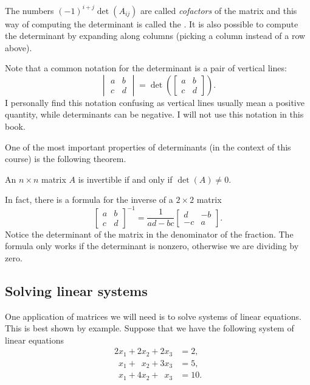 \documentclass[12pt]{book}
\begin{document}
The numbers ${(-1)}^{i+j}\det(A_{ij})$ are called
\emph{cofactors}
of the matrix and
this way of computing the determinant is called the
\emph{}.  It is also possible to compute the
determinant by expanding
along columns (picking a column instead of a row above).

Note that a common notation for the determinant is a pair of vertical
lines:
\begin{equation*}
\begin{vmatrix}
a & b \\
c & d
\end{vmatrix}
=
\det \left(
\begin{bmatrix}
a & b \\
c & d
\end{bmatrix}
\right) .
\end{equation*}
I personally find this notation confusing as vertical lines usually
mean a positive quantity, while determinants can be negative.  I will not
use this notation in this book.

\medskip

One of the most important properties of determinants (in the context of
this course)
is the following theorem.

\begin{theorem}
An $n \times n$ matrix $A$ is invertible if and only if $\det (A) \not= 0$.
\end{theorem}

In fact, there is a formula for the inverse of a $2 \times 2$ matrix
\begin{equation*}
\begin{bmatrix}
a & b \\
c & d
\end{bmatrix}^{-1}
=
\frac{1}{ad-bc}
\begin{bmatrix}
d & -b \\
-c & a
\end{bmatrix} .
\end{equation*}
Notice the determinant of the matrix in the denominator of the fraction.
The formula only works if the determinant is nonzero, otherwise we are
dividing by zero.

\subsection{Solving linear systems}

One application of matrices we will need is to solve systems of
linear equations.  This is best shown by example.
Suppose that we have the following system of linear equations
\begin{align*}
          2 x_1 +           2 x_2 +           2 x_3 & = 2 , \\
\phantom{9} x_1 + \phantom{9} x_2 +           3 x_3 & = 5 , \\
\phantom{9} x_1 +           4 x_2 + \phantom{9} x_3 & = 10 .
\end{align*}
\end{document}
